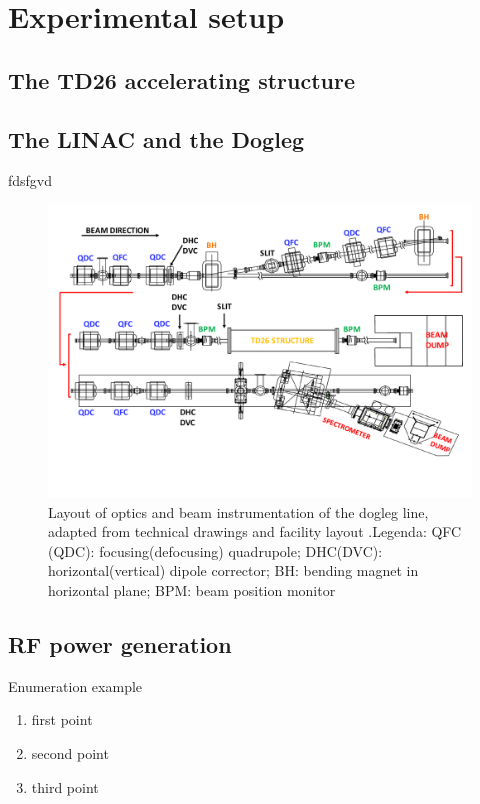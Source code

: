\chapter[Experimental setup]{Experimental setup}

\section[Main beam accelerating structure]{The TD26 accelerating structure}

\section[Linac and dogleg]{The LINAC and the Dogleg}
fdsfgvd


\begin{landscape}
\begin{figure}
\centering 
\includegraphics[scale=0.78]{pictures/modified_pets.pdf}
\caption{Layout of optics and beam instrumentation of the dogleg line, adapted from technical drawings and facility layout \cite{EDMS:CTF3}.Legenda: QFC (QDC): focusing(defocusing) quadrupole; DHC(DVC): horizontal(vertical) dipole corrector; BH: bending magnet in horizontal plane; BPM: beam position monitor}
\label{dolaut}
\end{figure}
\end{landscape}


\section[RF power generation]{RF power generation}

\noindent
Enumeration example
\begin{enumerate}
\item first point
\item second point
\item third point\\
\end{enumerate}

